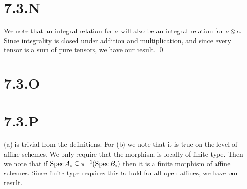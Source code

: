 \documentclass{article}
\begin{document}
\section{7.3.N}
We note that an integral relation for $a$ will also be an integral relation for
$a \otimes c$. Since integrality is closed under addition and multiplication,
and since every tensor is a sum of pure tensors, we have our result. \qed

\section{7.3.O}
\section{7.3.P}
 (a) is trivial from the definitions. For (b) we note that it is true on the
level of affine schemes. We only require that the morphism is locally of finite
type. Then we note that if $\operatorname{Spec} A_i \subseteq \pi^{-1}(\operatorname{Spec} B_i)$ then it is
a finite morphism of affine schemes. Since finite type requires this to hold
for all open affines, we have our result.
\end{document}
